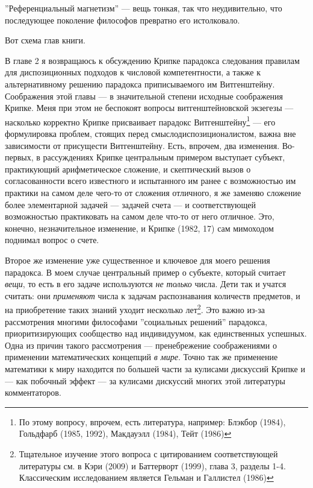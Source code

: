 \documentclass[11pt]{book}
\begin{document}
\smallskip

''Референциальный магнетизм'' --- вещь тонкая, так что неудивительно, что последующее поколение философов превратно его истолковало.

Вот схема глав книги.

В главе 2 я возвращаюсь к обсуждению Крипке парадокса следования правилам для диспозиционных подходов к числовой компетентности, а также к альтернативному решению парадокса приписываемого им Витгенштейну. Соображения этой главы --- в значительной степени исходные соображения Крипке. Меня при этом не беспокоят вопросы витгенштейновской экзегезы --- насколько корректно Крипке присваивает парадокс Витгенштейну\footnote{По этому вопросу, впрочем, есть литература, например: Блэкбор (1984), Гольдфарб (1985, 1992), Макдауэлл (1984), Тейт (1986)} --- его формулировка проблем, стоящих перед смыслодиспозиционалистом, важна вне зависимости от присущести Витгенштейну. Есть, впрочем, два изменения. Во-первых, в рассуждениях Крипке центральным примером выступает субъект, практикующий арифметическое сложение, и скептический вызов о согласованности всего известного и испытанного им ранее с возможностью им практики на самом деле чего-то от сложения отличного, я же заменяю сложение более элементарной задачей --- задачей счета --- и соответствующей возможностью практиковать на самом деле что-то от него отличное. Это, конечно, незначительное изменение, и Крипке (1982, 17) сам мимоходом поднимал вопрос о счете.

Второе же изменение уже существенное и ключевое для моего решения парадокса. В моем случае центральный пример о субъекте, который считает \textit{вещи}, то есть в его задаче используются \textit{не только} числа. Дети так и учатся считать: они \textit{применяют} числа к задачам распознавания количеств предметов, и на приобретение таких знаний уходит несколько лет\footnote{Тщательное изучение этого вопроса с цитированием соответствующей литературы см. в Кэри (2009) и Баттерворт (1999), глава 3, разделы 1-4. Классическим исследованием является Гельман и Галлистел (1986)}. Это важно из-за рассмотрения многими философами ''социальных решений'' парадокса, приоритизирующих сообщество над индивидуумом, как единственных успешных. Одна из причин такого рассмотрения --- пренебрежение соображениями о применении математических концепций \textit{в мире}. Точно так же применение математики к миру находится по большей части за кулисами дискуссий Крипке и --- как побочный эффект --- за кулисами дискуссий многих этой литературы комментаторов.
\end{document}
